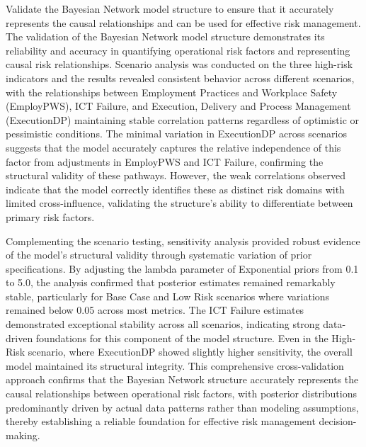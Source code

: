 Validate the Bayesian Network model structure to ensure that it accurately represents the causal relationships and can be used for effective risk management.  
The validation of the Bayesian Network model structure demonstrates its reliability and accuracy in quantifying operational risk factors and representing causal risk relationships. Scenario analysis was conducted on the three high-risk indicators and the results revealed consistent behavior across different scenarios, with the relationships between Employment Practices and Workplace Safety (EmployPWS), ICT Failure, and Execution, Delivery and Process Management (ExecutionDP) maintaining stable correlation patterns regardless of optimistic or pessimistic conditions. The minimal variation in ExecutionDP across scenarios suggests that the model accurately captures the relative independence of this factor from adjustments in EmployPWS and ICT Failure, confirming the structural validity of these pathways. However, the weak correlations observed indicate that the model correctly identifies these as distinct risk domains with limited cross-influence, validating the structure's ability to differentiate between primary risk factors.

Complementing the scenario testing, sensitivity analysis provided robust evidence of the model's structural validity through systematic variation of prior specifications. By adjusting the lambda parameter of Exponential priors from 0.1 to 5.0, the analysis confirmed that posterior estimates remained remarkably stable, particularly for Base Case and Low Risk scenarios where variations remained below 0.05 across most metrics. The ICT Failure estimates demonstrated exceptional stability across all scenarios, indicating strong data-driven foundations for this component of the model structure. Even in the High-Risk scenario, where ExecutionDP showed slightly higher sensitivity, the overall model maintained its structural integrity. This comprehensive cross-validation approach confirms that the Bayesian Network structure accurately represents the causal relationships between operational risk factors, with posterior distributions predominantly driven by actual data patterns rather than modeling assumptions, thereby establishing a reliable foundation for effective risk management decision-making.

